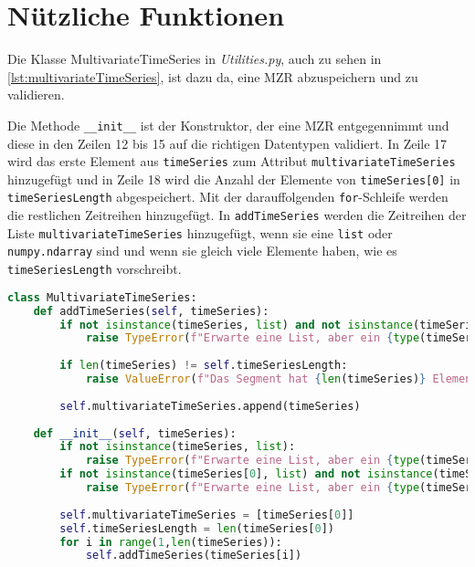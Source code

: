 \section{Nützliche Funktionen}
Die Klasse MultivariateTimeSeries in \textit{Utilities.py}, auch zu sehen in \autoref{lst:multivariateTimeSeries}, ist dazu da, eine \ac{MZR} abzuspeichern und zu validieren.

Die Methode \lstinline{__init__} ist der Konstruktor, der eine \ac{MZR} entgegennimmt und diese in den Zeilen 12 bis 15 auf die richtigen Datentypen validiert. In Zeile 17 wird das erste Element aus \lstinline|timeSeries| zum Attribut \lstinline|multivariateTimeSeries| hinzugefügt und in Zeile 18 wird die Anzahl der Elemente von \lstinline|timeSeries[0]| in \lstinline|timeSeriesLength| abgespeichert. Mit der darauffolgenden \lstinline|for|-Schleife werden die restlichen Zeitreihen hinzugefügt. In \lstinline|addTimeSeries| werden die Zeitreihen der Liste \lstinline|multivariateTimeSeries| hinzugefügt, wenn sie eine \lstinline|list| oder \lstinline|numpy.ndarray| sind und wenn sie gleich viele Elemente haben, wie es \lstinline|timeSeriesLength| vorschreibt. 
\begin{lstlisting}[caption=Klasse für \ac{MZR}, language=Python, label=lst:multivariateTimeSeries, style=Python]
class MultivariateTimeSeries:
    def addTimeSeries(self, timeSeries):
        if not isinstance(timeSeries, list) and not isinstance(timeSeries, np.ndarray):
            raise TypeError(f"Erwarte eine List, aber ein {type(timeSeries)} erhalten.")
        
        if len(timeSeries) != self.timeSeriesLength:
            raise ValueError(f"Das Segment hat {len(timeSeries)} Element(e), muss aber {self.timeSeriesLength} haben.")
        
        self.multivariateTimeSeries.append(timeSeries)
    
    def __init__(self, timeSeries):
        if not isinstance(timeSeries, list):
            raise TypeError(f"Erwarte eine List, aber ein {type(timeSeries)} erhalten.")
        if not isinstance(timeSeries[0], list) and not isinstance(timeSeries[0], np.ndarray):
            raise TypeError(f"Erwarte eine List, aber ein {type(timeSeries[0])} erhalten.")
        
        self.multivariateTimeSeries = [timeSeries[0]]
        self.timeSeriesLength = len(timeSeries[0])
        for i in range(1,len(timeSeries)):
            self.addTimeSeries(timeSeries[i])
\end{lstlisting}

